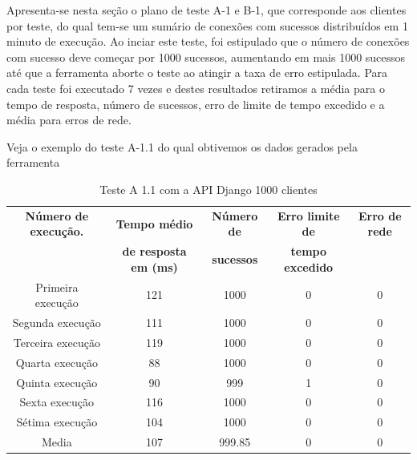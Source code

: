   Apresenta-se nesta seção o plano de teste A-1 e B-1, que corresponde aos clientes por teste,  do qual tem-se um sumário
  de conexões com sucessos distribuídos em 1 minuto de execução.
  Ao inciar este teste, foi estipulado que o número de conexões com sucesso deve começar por 1000 sucessos, aumentando
  em mais 1000 sucessos até que a ferramenta aborte o teste ao atingir a taxa de erro estipulada. Para cada teste
  foi executado 7 vezes e destes resultados retiramos a média para o tempo de resposta, número de sucessos, erro de limite de tempo excedido
  e a média para erros de rede.

  Veja o exemplo do teste A-1.1 do qual obtivemos os dados gerados pela ferramenta

  \begin{table}[H]
    \centering
    \footnotesize
    \setlength{\abovecaptionskip}{0pt}
    \setlength{\belowcaptionskip}{0pt}
    \caption[Teste A-1.1 com a API Django 1000 clientes]{Teste A 1.1 com a API Django 1000 clientes}
    \label{tab:teste-a-1-1}
    \begin{tabular}{c|c|c|c|c}
      \hline \hline
      \textbf{Número de execução.} & \textbf{Tempo médio } &	\textbf{Número de } & \textbf{Erro limite de} & \textbf{Erro de rede}  \\
	    {}			   & \textbf{de resposta em (ms) } &\textbf{sucessos } & \textbf{tempo excedido} & {}  \\
      \hline \hline
      Primeira execução &		121 &				1000 &			0 &			0 \\
      Segunda execução &		111 &				1000 &			0 &			0 \\
      Terceira execução &		119 &				1000 &			0 &			0 \\
      Quarta execução  &		88 &				1000 &			0 &			0 \\
      Quinta execução  &		90 &				999 &			1 &			0 \\
      Sexta execução   &		116 &				1000 &			0 &			0 \\
      Sétima execução  &		104 &				1000 &			0 &			0 \\
      Media & 				107 &				999.85 & 		0 &			0 \\
      \hline \hline
    \end{tabular}
  \end{table}

